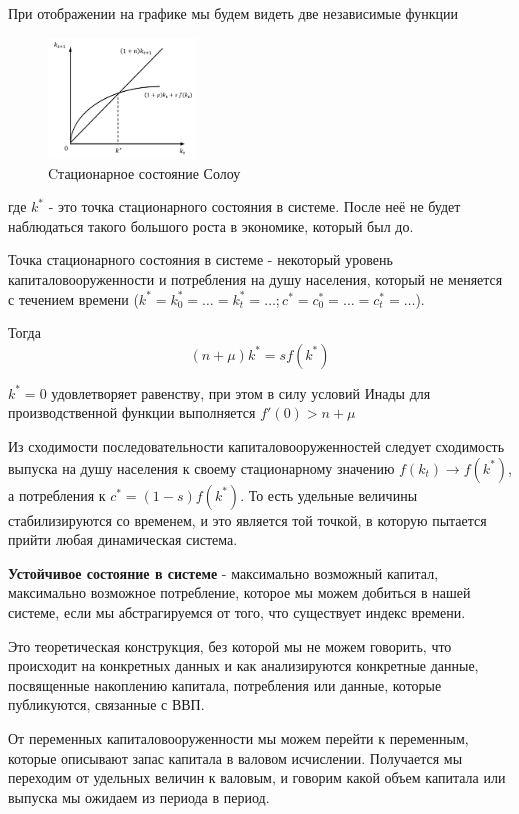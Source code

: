\documentclass[reqno]{article}
\theoremstyle{definition}
\theoremstyle{definition}
\theoremstyle{definition}
\theoremstyle{definition}
\theoremstyle{definition}
\theoremstyle{definition}
\theoremstyle{definition}
\theoremstyle{definition}
\theoremstyle{definition}
\begin{document}
	При отображении на графике мы будем видеть две независимые функции
	
	\begin{figure}[h!]
		\centering
		\includegraphics[width=0.35\textwidth]{Cтационарное_состояние_Солоу}
		\caption{Cтационарное состояние Солоу}
	\end{figure}
	
	где $k^*$ - это  точка стационарного состояния в системе. После неё не будет наблюдаться такого большого роста в экономике, который был до.
	
	Точка стационарного состояния в системе - некоторый уровень капиталовооруженности и потребления на душу населения, который не меняется с течением времени ($k^* = k_0^* = \dots = k_t^* = \dots; c^* = c_0^* = \dots = c_t^* = \dots$). 
	
	Тогда $$(n + \mu) k^* = s f(k^*)$$
	
	$k^*=0$ удовлетворяет равенству, при этом в силу условий Инады для производственной функции выполняется $f'(0) > n + \mu$
	
	Из сходимости последовательности капиталовооруженностей следует сходимость выпуска на душу населения к своему стационарному значению $f(k_t) \rightarrow f(k^*)$, а потребления к $c^* = (1-s)f(k^*)$. То есть удельные величины стабилизируются со временем, и это является той точкой, в которую пытается прийти любая динамическая система. 
	
	\textbf{Устойчивое состояние в системе} - максимально возможный капитал, максимально возможное потребление, которое мы можем добиться в нашей системе, если мы абстрагируемся от того, что существует индекс времени.
	
	Это теоретическая конструкция, без которой мы не можем говорить, что происходит на конкретных данных и как анализируются конкретные данные, посвященные накоплению капитала, потребления или данные, которые публикуются, связанные с ВВП.\bigskip
	
	От переменных капиталовооруженности мы можем перейти к переменным, которые описывают запас капитала в валовом исчислении. Получается мы переходим от удельных величин к валовым, и говорим какой объем капитала или выпуска мы ожидаем из периода в период. 
	
\end{document}
